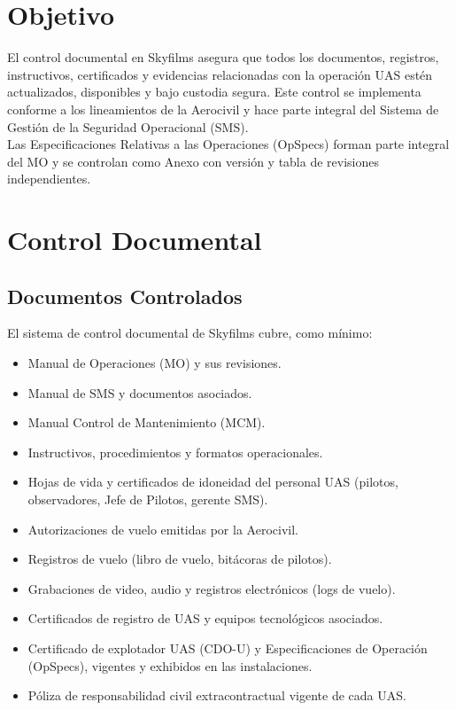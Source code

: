 
\section{Objetivo}
\label{inicio_cap5}

El control documental en Skyfilms asegura que todos los documentos, registros, instructivos, certificados y evidencias relacionadas con la operación UAS estén actualizados, disponibles y bajo custodia segura. Este control se implementa conforme a los lineamientos de la Aerocivil y hace parte integral del Sistema de Gestión de la Seguridad Operacional (SMS).\\

Las Especificaciones Relativas a las Operaciones (OpSpecs) forman parte integral del MO y se controlan como Anexo con versión y tabla de revisiones independientes.


\section{Control Documental}

\subsection{Documentos Controlados}
El sistema de control documental de Skyfilms cubre, como mínimo:
\begin{itemize}
    \item Manual de Operaciones (MO) y sus revisiones.
    \item Manual de SMS y documentos asociados.
    \item Manual Control de Mantenimiento (MCM).
    \item Instructivos, procedimientos y formatos operacionales.
    \item Hojas de vida y certificados de idoneidad del personal UAS (pilotos, observadores, Jefe de Pilotos, gerente SMS).
    \item Autorizaciones de vuelo emitidas por la Aerocivil.
    \item Registros de vuelo (libro de vuelo, bitácoras de pilotos).
    \item Grabaciones de video, audio y registros electrónicos (logs de vuelo).
    \item Certificados de registro de UAS y equipos tecnológicos asociados.
    \item Certificado de explotador UAS (CDO-U) y Especificaciones de Operación (OpSpecs), vigentes y exhibidos en las instalaciones.
    \item Póliza de responsabilidad civil extracontractual vigente de cada UAS.
\end{itemize}

